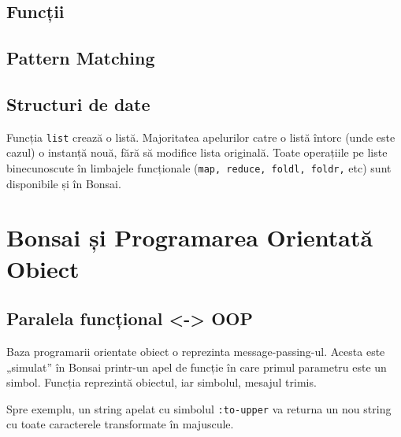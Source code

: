 \documentclass[12pt,a4paper]{memoir}
\begin{document}
\section{Funcții}

\section{Pattern Matching}

\section{Structuri de date}

Funcția \texttt{list} crează o listă. Majoritatea apelurilor catre o listă întorc (unde este cazul) o instanță nouă, fără să modifice lista originală. Toate operațiile pe liste binecunoscute în limbajele funcționale (\texttt{map, reduce, foldl, foldr,} etc) sunt disponibile și în Bonsai.

\chapter{Bonsai și Programarea Orientată Obiect}


\section{Paralela funcțional <-> OOP}

Baza programarii orientate obiect o reprezinta message-passing-ul. Acesta este „simulat” în Bonsai printr-un apel de funcție în care primul parametru este un simbol. Funcția reprezintă obiectul, iar simbolul, mesajul trimis. 

Spre exemplu, un string apelat cu simbolul \texttt{:to-upper} va returna un nou string cu toate caracterele transformate în majuscule. 
\end{document}
